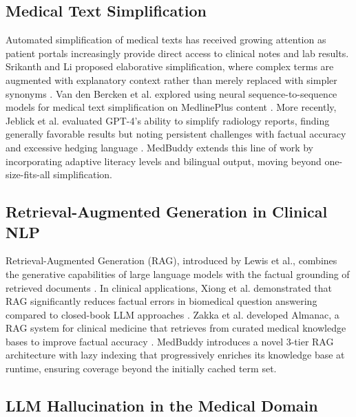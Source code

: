 \documentclass[conference]{IEEEtran}
\begin{document}
\subsection{Medical Text Simplification}

Automated simplification of medical texts has received growing attention as patient portals increasingly provide direct access to clinical notes and lab results. Srikanth and Li proposed elaborative simplification, where complex terms are augmented with explanatory context rather than merely replaced with simpler synonyms \cite{srikanth2021elaborative}. Van den Bercken et al. explored using neural sequence-to-sequence models for medical text simplification on MedlinePlus content \cite{vandenbercken2019biomedical}. More recently, Jeblick et al. evaluated GPT-4's ability to simplify radiology reports, finding generally favorable results but noting persistent challenges with factual accuracy and excessive hedging language \cite{jeblick2024chatgpt}. MedBuddy extends this line of work by incorporating adaptive literacy levels and bilingual output, moving beyond one-size-fits-all simplification.

\subsection{Retrieval-Augmented Generation in Clinical NLP}

Retrieval-Augmented Generation (RAG), introduced by Lewis et al., combines the generative capabilities of large language models with the factual grounding of retrieved documents \cite{lewis2020retrieval}. In clinical applications, Xiong et al. demonstrated that RAG significantly reduces factual errors in biomedical question answering compared to closed-book LLM approaches \cite{xiong2024benchmarking}. Zakka et al. developed Almanac, a RAG system for clinical medicine that retrieves from curated medical knowledge bases to improve factual accuracy \cite{zakka2024almanac}. MedBuddy introduces a novel 3-tier RAG architecture with lazy indexing that progressively enriches its knowledge base at runtime, ensuring coverage beyond the initially cached term set.

\subsection{LLM Hallucination in the Medical Domain}
\end{document}
